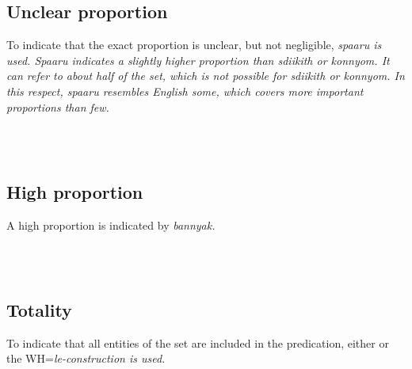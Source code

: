 \subsection{Unclear proportion}\label{sec:func:Unclearproportion}
To indicate that the exact proportion is unclear, but not negligible, \em spaaru \em is used.
\em Spaaru \em indicates a slightly higher proportion than \em sdiikith \em or \em konnyom\em. It can refer to about half of the set, which is not possible for \em sdiikith \em or \em konnyom\em. In this respect, \em spaaru \em resembles English \em some\em, which covers more important proportions than \em few\em.

 \\
 \\
\subsection{High proportion}\label{sec:func:Highproportion}
A high proportion is indicated by \em bannyak\em.


 \\
 \\
\subsection{Totality}\label{sec:func:Totality}
To indicate that all entities of the set are included in the predication, either  or the WH=\em le\em-construction is used.

